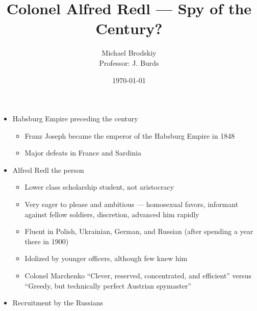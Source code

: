

\title{Colonel Alfred Redl — Spy of the Century?}
\date{\today}
\author{Michael Brodskiy\\ \small Professor: J. Burds}



\maketitle

\begin{itemize}

  \item Habsburg Empire preceding the  century

    \begin{itemize}

      \item Franz Joseph became the emperor of the Habsburg Empire in 1848

      \item Major defeats in France and Sardinia

    \end{itemize}

  \item Alfred Redl the person

    \begin{itemize}

      \item Lower class scholarship student, not aristocracy

      \item Very eager to please and ambitious — homosexual favors, informant against fellow soldiers, discretion, advanced him rapidly

      \item Fluent in Polish, Ukrainian, German, and Russian (after spending a year there in 1900)

      \item Idolized by younger officers, although few knew him

      \item Colonel Marchenko ``Clever, reserved, concentrated, and efficient'' versus ``Greedy, but technically perfect Austrian spymaster''

    \end{itemize}

  \item Recruitment by the Russians

    \begin{itemize}


\end{itemize}
\end{itemize}
